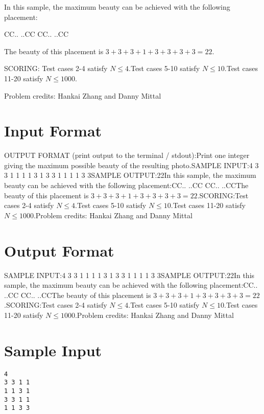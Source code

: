 \documentclass[12pt]{article}
\begin{document}
In this sample, the maximum beauty can be achieved with the following placement:


CC..
..CC
CC..
..CC

The beauty of this placement is $3 + 3 + 3 + 1 + 3 + 3 + 3 + 3 = 22$.

SCORING:
Test cases 2-4 satisfy $N \le 4$.Test cases 5-10 satisfy $N\le 10$.Test cases 11-20 satisfy $N \le 1000$.


Problem credits: Hankai Zhang and Danny Mittal



\section*{Input Format}
OUTPUT FORMAT (print output to the terminal / stdout):Print one integer giving the maximum possible beauty of the resulting photo.SAMPLE INPUT:4
3 3 1 1
1 1 3 1
3 3 1 1
1 1 3 3SAMPLE OUTPUT:22In this sample, the maximum beauty can be achieved with the following placement:CC..
..CC
CC..
..CCThe beauty of this placement is $3 + 3 + 3 + 1 + 3 + 3 + 3 + 3 = 22$.SCORING:Test cases 2-4 satisfy $N \le 4$.Test cases 5-10 satisfy $N\le 10$.Test cases 11-20 satisfy $N \le 1000$.Problem credits: Hankai Zhang and Danny Mittal

\section*{Output Format}
SAMPLE INPUT:4
3 3 1 1
1 1 3 1
3 3 1 1
1 1 3 3SAMPLE OUTPUT:22In this sample, the maximum beauty can be achieved with the following placement:CC..
..CC
CC..
..CCThe beauty of this placement is $3 + 3 + 3 + 1 + 3 + 3 + 3 + 3 = 22$.SCORING:Test cases 2-4 satisfy $N \le 4$.Test cases 5-10 satisfy $N\le 10$.Test cases 11-20 satisfy $N \le 1000$.Problem credits: Hankai Zhang and Danny Mittal

\section*{Sample Input}
\begin{verbatim}
4
3 3 1 1
1 1 3 1
3 3 1 1
1 1 3 3
\end{verbatim}
\end{document}
